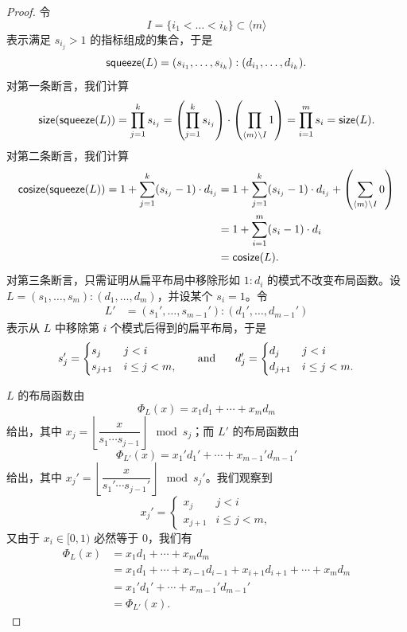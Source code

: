 \begin{proof} 令
\[
I = \{i_1<\dots<i_{k}\} \subset \langle m \rangle
\] 表示满足 $s_{i_j} > 1$ 的指标组成的集合，于是
\[
    \mathsf{squeeze}(L) = (s_{i_1},\dots,s_{i_{k}}):(d_{i_1},\dots,d_{i_{k}}).
\]
对第一条断言，我们计算
\begin{align*} \mathsf{size}(\mathsf{squeeze}(L))  = \prod_{j=1}^{k} s_{i_j} = \left( \prod_{j=1}^{k} s_{i_j} \right)\cdot\left( \prod_{\langle m \rangle \setminus I} 1 \right) = \prod_{i=1}^m s_i = \mathsf{size}(L).
\end{align*}
对第二条断言，我们计算
\begin{align*} \mathsf{cosize}(\mathsf{squeeze}(L))  = 1 + \sum_{j=1}^{k} (s_{i_j} - 1)\cdot d_{i_j}
& = 1 + \sum_{j=1}^{k} (s_{i_j}-1)\cdot d_{i_j} + \left( \sum_{\langle m \rangle \setminus I} 0 \right)\\
& = 1 + \sum_{i=1}^m (s_i-1)\cdot d_i\\
& = \mathsf{cosize}(L).
\end{align*}
对第三条断言，只需证明从扁平布局中移除形如 $1:d_i$ 的模式不改变布局函数。设 $L=(s_1,\dots,s_m):(d_1,\dots,d_m)$，并设某个 $s_i=1$。令
    \begin{align*} L' & = (s_1',\dots,s_{m-1}'):(d_1',\dots,d_{m-1}')
    \end{align*}
    表示从 $L$ 中移除第 $i$ 个模式后得到的扁平布局，于是
    \[
    s_j' = \begin{cases} s_j & j < i\\
    s_{j+1} & i \leq j < m,
    \end{cases}
    \hspace{0.2in}\text{ and } \hspace{0.2in} d_j'  = \begin{cases} d_j & j < i\\
    d_{j+1} & i \leq j < m.
    \end{cases}
    \]

    \noindent $L$ 的布局函数由
    \[
    \Phi_L(x) = x_1 d_1 + \cdots + x_m d_m
    \]
    给出，其中 $x_j = \left\lfloor \dfrac{x}{s_1\cdots s_{j-1}} \right \rfloor \mod s_j$；而 $L'$ 的布局函数由
    \[
    \Phi_{L'}(x) = x_1' d_1' + \cdots + x_{m-1}'d_{m-1}'
    \]
    给出，其中 $x_j' = \left\lfloor \dfrac{x}{s_1'\cdots s_{j-1}'} \right \rfloor \mod s_j'$。我们观察到
    \[
    x_j' = \begin{cases} x_j & j < i\\
    x_{j+1} & i \leq j < m,
    \end{cases}
    \]
    又由于 $x_i \in {[}0,1{)}$ 必然等于 $0$，我们有
    \begin{align*}
        \Phi_{L}(x) & = x_1 d_1 + \cdots + x_m d_m \\
        & = x_1 d_1 + \cdots + x_{i-1} d_{i-1} + x_{i+1} d_{i+1} + \cdots + x_m d_m \\
        & = x_1' d_1' + \cdots + x_{m-1}'d_{m-1}'\\
        & = \Phi_{L'}(x).
    \end{align*}
\end{proof}


